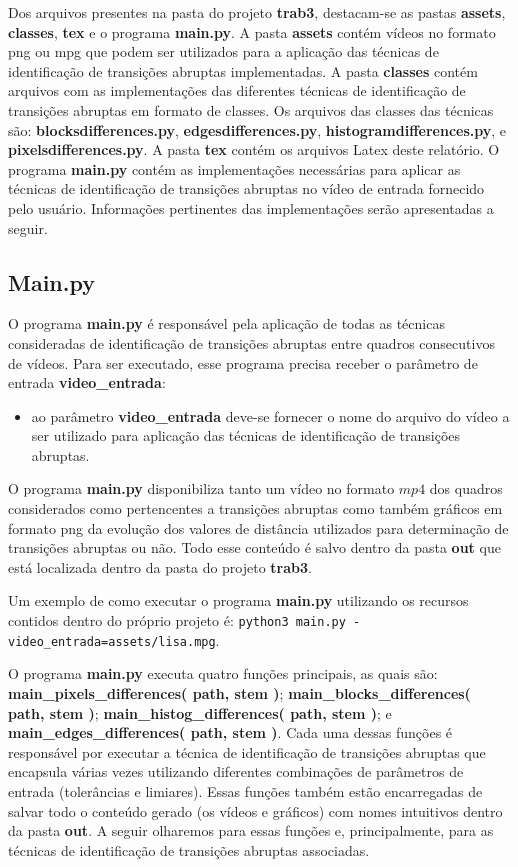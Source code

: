\documentclass{article}
\begin{document}
Dos arquivos presentes na pasta do projeto \textbf{trab3}, destacam-se as pastas \textbf{assets}, \textbf{classes}, \textbf{tex} e o programa \textbf{main.py}. A pasta \textbf{assets} contém vídeos no formato png ou mpg que podem ser utilizados para a aplicação das técnicas de identificação de transições abruptas implementadas. A pasta \textbf{classes} contém arquivos com as implementações das diferentes técnicas de identificação de transições abruptas em formato de classes. Os arquivos das classes das técnicas são: \textbf{blocksdifferences.py}, \textbf{edgesdifferences.py}, \textbf{histogramdifferences.py}, e \textbf{pixelsdifferences.py}. A pasta \textbf{tex} contém os arquivos Latex deste relatório. O programa \textbf{main.py} contém as implementações necessárias para aplicar as técnicas de identificação de transições abruptas no vídeo de entrada fornecido pelo usuário. Informações pertinentes das implementações serão apresentadas a seguir.

%
\subsection{Main.py}
O programa \textbf{main.py} é responsável pela aplicação de todas as técnicas consideradas de identificação de transições abruptas entre quadros consecutivos de vídeos. Para ser executado, esse programa precisa receber o parâmetro de entrada \textbf{video\_entrada}:

\begin{itemize}
	\item ao parâmetro \textbf{video\_entrada} deve-se fornecer o nome do arquivo do vídeo a ser utilizado para aplicação das técnicas de identificação de transições abruptas.
\end{itemize}
	
\noindent 
O programa \textbf{main.py} disponibiliza tanto um vídeo no formato $mp4$ dos quadros considerados como pertencentes a transições abruptas como também gráficos em formato png da evolução dos valores de distância utilizados para determinação de transições abruptas ou não. Todo esse conteúdo é salvo dentro da pasta \textbf{out} que está localizada dentro da pasta do projeto \textbf{trab3}.

Um exemplo de como executar o programa \textbf{main.py} utilizando os recursos contidos dentro do próprio projeto é: \lstinline{python3 main.py -video_entrada=assets/lisa.mpg}.

O programa \textbf{main.py} executa quatro funções principais, as quais são: \textbf{main\_pixels\_differences( path, stem )}; \textbf{main\_blocks\_differences( path, stem )}; \textbf{main\_histog\_differences( path, stem )}; e \textbf{main\_edges\_differences( path, stem )}. Cada uma dessas funções é responsável por executar a técnica de identificação de transições abruptas que encapsula várias vezes utilizando diferentes combinações de parâmetros de entrada (tolerâncias e limiares). Essas funções também estão encarregadas de salvar todo o conteúdo gerado (os vídeos e gráficos) com nomes intuitivos dentro da pasta \textbf{out}. A seguir olharemos para essas funções e, principalmente, para as técnicas de identificação de transições abruptas associadas.
\end{document}
